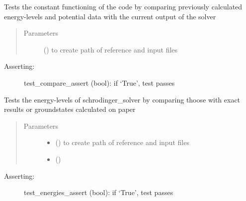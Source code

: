 \documentclass[letterpaper,10pt,english]{sphinxmanual}
\begin{document}
\begin{fulllineitems}
\label{\detokenize{index:test_schrodinger_solver.test_compare}}
Tests the constant functioning of the code by comparing previously
calculated energy-levels and potential data with the current output of the solver
\begin{quote}\begin{description}
\item[{Parameters}] \leavevmode
{} () \textendash{} to create path of reference and input files

\end{description}\end{quote}
\begin{description}
\item[{Asserting:}] \leavevmode
test\_compare\_assert (bool): if ‘True’, test passes

\end{description}

\end{fulllineitems}


\begin{fulllineitems}
\label{\detokenize{index:test_schrodinger_solver.test_energies}}
Tests the energy-levels of schrodinger\_solver by comparing thoose
with exact results or groundstates calculated on paper
\begin{quote}\begin{description}
\item[{Parameters}] \leavevmode\begin{itemize}
\item {} 
 () \textendash{} to create path of reference and input files

\item {} 
 () \textendash{} 

\end{itemize}

\end{description}\end{quote}
\begin{description}
\item[{Asserting:}] \leavevmode
test\_energies\_assert (bool): if ‘True’, test passes

\end{description}

\end{fulllineitems}
\end{document}
